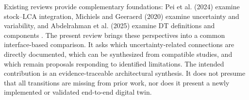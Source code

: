 Existing reviews provide complementary foundations: Pei et al. (2024) examine stock--LCA integration, Michiels and Geeraerd (2020) examine uncertainty and variability, and Abdelrahman et al. (2025) examine DT definitions and components \citep{I35,I25,I31}. The present review brings these perspectives into a common interface-based comparison. It asks which uncertainty-related connections are directly documented, which can be synthesized from compatible studies, and which remain proposals responding to identified limitations. The intended contribution is an evidence-traceable architectural synthesis. It does not presume that all transitions are missing from prior work, nor does it present a newly implemented or validated end-to-end digital twin.